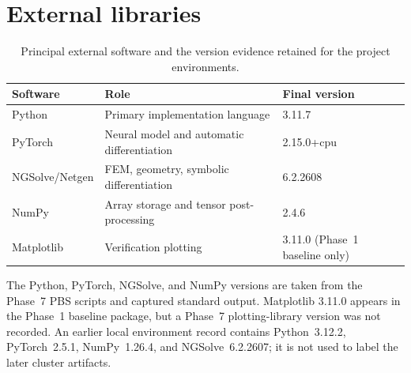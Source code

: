 \section{External libraries}

\begin{table}[H]
\centering
\caption{Principal external software and the version evidence retained for
the project environments.}
\label{tab:software}
\begin{tabular}{@{}lll@{}}
\toprule
Software & Role & Final version\\
\midrule
Python & Primary implementation language & 3.11.7\\
PyTorch & Neural model and automatic differentiation & 2.15.0+cpu\\
NGSolve/Netgen & FEM, geometry, symbolic differentiation & 6.2.2608\\
NumPy & Array storage and tensor post-processing & 2.4.6\\
Matplotlib & Verification plotting & 3.11.0 (Phase~1 baseline only)\\
\bottomrule
\end{tabular}
\end{table}

The Python, PyTorch, NGSolve, and NumPy versions are taken from the Phase~7
PBS scripts and captured standard output. Matplotlib 3.11.0 appears in the
Phase~1 baseline package, but a Phase~7 plotting-library version was not
recorded. An earlier local environment record contains Python~3.12.2,
PyTorch~2.5.1, NumPy~1.26.4, and NGSolve~6.2.2607; it is not used to label the
later cluster artifacts.
